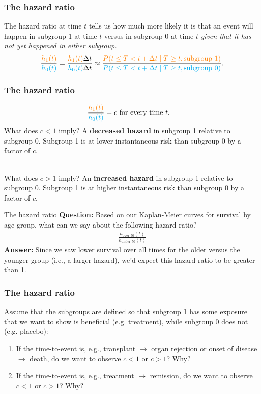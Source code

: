 \documentclass[10pt,t]{beamer}
\begin{document}
\begin{frame}
\frametitle{The hazard ratio}
The hazard ratio at time $t$ tells us how much more likely it is that an event will happen in subgroup 1 at time $t$ versus in subgroup 0 at time $t$ \textit{given that it has not yet happened in either subgroup.}
\begin{align*}
\frac{\textcolor{orange}{h_1(t)}}{\textcolor{cyan}{h_0(t)}} = \frac{\textcolor{orange}{h_1(t)}\Delta t}{\textcolor{cyan}{h_0(t)}\Delta t} \approx \frac{\textcolor{orange}{P(t \leq T < t + \Delta t \mid T \geq t, \text{subgroup }1)}}{\textcolor{cyan}{P(t \leq T < t + \Delta t \mid T \geq t, \text{subgroup }0)}}.
\end{align*}

\end{frame}

\begin{frame}
\frametitle{The hazard ratio}
\begin{align*}
	\frac{\textcolor{orange}{h_1(t)}}{\textcolor{cyan}{h_0(t)}} &= c \text{ for every time } t,
\end{align*}
What does $c < 1$ imply? \pause A \textbf{decreased hazard} in subgroup 1 relative to subgroup 0. Subgroup 1 is at lower instantaneous risk than subgroup 0 by a factor of $c$.\pause 
\\ ~\ 

What does $c > 1$ imply? \pause An \textbf{increased hazard} in subgroup 1 relative to subgroup 0.  Subgroup 1 is at higher instantaneous risk than subgroup 0 by a factor of $c$.
\end{frame}

\begin{frame}{The hazard ratio}
	\textbf{Question:} Based on our Kaplan-Meier curves for survival by age group, what can we say about the following hazard ratio?
	\begin{align*}
		\frac{h_{\text{over 50}}(t)}{h_{\text{under 50}}(t)}
	\end{align*} \pause 
	\textbf{Answer:} Since we saw lower survival over all times for the older versus the younger group (i.e., a larger hazard), we'd expect this hazard ratio to be greater than 1.
\end{frame}

\begin{frame}
\frametitle{The hazard ratio}
Assume that the subgroups are defined so that subgroup 1 has some exposure that we want to show is beneficial (e.g. treatment), while subgroup 0 does not (e.g. placebo):

\begin{enumerate}
\item If the time-to-event is, e.g., transplant $\rightarrow$ organ rejection or onset of disease $\rightarrow$ death, do we want to observe $c < 1$ or $c > 1$? Why?
\item If the time-to-event is, e.g., treatment $\rightarrow$ remission, do we want to observe $c < 1$ or $c > 1$? Why?
\end{enumerate}
\end{frame}
\end{document}

